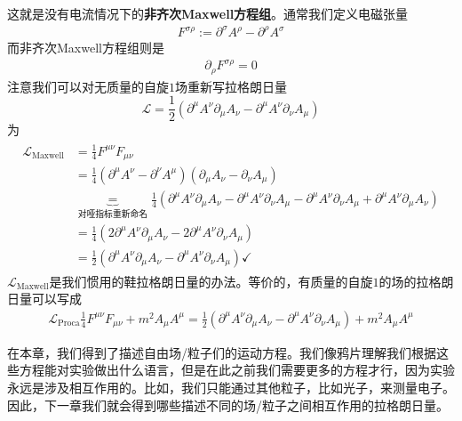 这就是没有电流情况下的{\bf 非齐次Maxwell方程组}。通常我们定义电磁张量
\begin{align}
F^{\sigma\rho}:=\partial^\sigma A^\rho-\partial^\rho A^\sigma
\end{align}
而非齐次Maxwell方程组则是
\begin{align}
\partial_\rho F^{\sigma\rho}=0
\end{align}
注意我们可以对无质量的自旋$1$场重新写拉格朗日量
\[\mathscr{L}=\frac{1}{2}(\partial^\mu A^\nu\partial_\mu A_\nu - \partial^\mu A^\nu\partial_\nu A_\mu) \]
为
\begin{align}
\begin{split}
\mathscr{L}_{\text{Maxwell}}&=\frac{1}{4}F^{\mu\nu}F_{\mu\nu}\\
&=\frac{1}{4}(\partial^\mu A^\nu-\partial^\nu A^\mu)(\partial_\mu A_\nu-\partial_\nu A_\mu)\\
&\underbrace{=}_{\text{对哑指标重新命名}}\frac{1}{4}(\partial^\mu A^\nu\partial_\mu A_\nu - \partial^\mu A^\nu\partial_\nu A_\mu-\partial^\mu A^\nu\partial_\nu A_\mu+\partial^\mu A^\nu\partial_\mu A_\nu)\\
&=\frac{1}{4}(2\partial^\mu A^\nu\partial_\mu A_\nu - 2\partial^\mu A^\nu\partial_\nu A_\mu)\\
&=\frac{1}{2}(\partial^\mu A^\nu\partial_\mu A_\nu - \partial^\mu A^\nu\partial_\nu A_\mu)\checkmark
\end{split}
\end{align}
$\mathscr{L}_{\text{Maxwell}}$是我们惯用的鞋拉格朗日量的办法。等价的，有质量的自旋$1$的场的拉格朗日量可以写成
\begin{align}
\mathscr{L}_{\text{Proca}}\frac{1}{4}F^{\mu\nu}F_{\mu\nu}+m^2A_\mu A^\mu=\frac{1}{2}(\partial^\mu A^\nu\partial_\mu A_\nu - \partial^\mu A^\nu\partial_\nu A_\mu)+m^2A_\mu A^\mu
\end{align}

在本章，我们得到了描述自由场/粒子们的运动方程。我们像鸦片理解我们根据这些方程能对实验做出什么语言，但是在此之前我们需要更多的方程才行，因为实验永远是涉及相互作用的。比如，我们只能通过其他粒子，比如光子，来测量电子。因此，下一章我们就会得到哪些描述不同的场/粒子之间相互作用的拉格朗日量。




